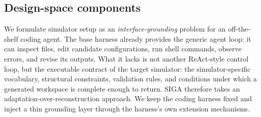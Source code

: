 \documentclass{article}
\begin{document}



\subsection{Design-space components}
\label{subsec:overview}

We formulate simulator setup as an \emph{interface-grounding} problem for an off-the-shelf coding agent. 
The base harness already provides the generic agent loop: it can inspect files, edit candidate configurations, run shell commands, observe errors, and revise its outputs. 
What it lacks is not another ReAct-style control loop, but the executable contract of the target simulator: the simulator-specific vocabulary, structural constraints, validation rules, and conditions under which a generated workspace is complete enough to return. 
SIGA therefore takes an adaptation-over-reconstruction approach. 
We keep the coding harness fixed and inject a thin grounding layer through the harness's own extension mechanisms.
\end{document}
